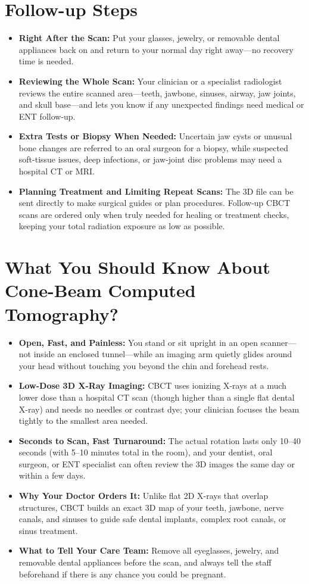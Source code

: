 \section{Follow-up Steps}
\begin{itemize}
    \item \textbf{Right After the Scan:} Put your glasses, jewelry, or removable dental appliances back on and return to your normal day right away---no recovery time is needed.
    \item \textbf{Reviewing the Whole Scan:} Your clinician or a specialist radiologist reviews the entire scanned area---teeth, jawbone, sinuses, airway, jaw joints, and skull base---and lets you know if any unexpected findings need medical or ENT follow-up.
    \item \textbf{Extra Tests or Biopsy When Needed:} Uncertain jaw cysts or unusual bone changes are referred to an oral surgeon for a biopsy, while suspected soft-tissue issues, deep infections, or jaw-joint disc problems may need a hospital CT or MRI.
    \item \textbf{Planning Treatment and Limiting Repeat Scans:} The 3D file can be sent directly to make surgical guides or plan procedures. Follow-up CBCT scans are ordered only when truly needed for healing or treatment checks, keeping your total radiation exposure as low as possible.
\end{itemize}

\section{What You Should Know About Cone-Beam Computed Tomography?}
\begin{itemize}
    \item \textbf{Open, Fast, and Painless:} You stand or sit upright in an open scanner---not inside an enclosed tunnel---while an imaging arm quietly glides around your head without touching you beyond the chin and forehead rests.
    \item \textbf{Low-Dose 3D X-Ray Imaging:} CBCT uses ionizing X-rays at a much lower dose than a hospital CT scan (though higher than a single flat dental X-ray) and needs no needles or contrast dye; your clinician focuses the beam tightly to the smallest area needed.
    \item \textbf{Seconds to Scan, Fast Turnaround:} The actual rotation lasts only 10--40 seconds (with 5--10 minutes total in the room), and your dentist, oral surgeon, or ENT specialist can often review the 3D images the same day or within a few days.
    \item \textbf{Why Your Doctor Orders It:} Unlike flat 2D X-rays that overlap structures, CBCT builds an exact 3D map of your teeth, jawbone, nerve canals, and sinuses to guide safe dental implants, complex root canals, or sinus treatment.
    \item \textbf{What to Tell Your Care Team:} Remove all eyeglasses, jewelry, and removable dental appliances before the scan, and always tell the staff beforehand if there is any chance you could be pregnant.
\end{itemize}

